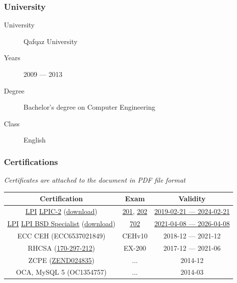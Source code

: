 \documentclass {article}
\begin{document}
      \subsubsection {University}
        \begin {description}
          \item [University] Qafqaz University
          \item [Years] 2009 --- 2013
          \item [Degree] Bachelor's degree on Computer Engineering
          \item [Class] English
        \end {description}

        \subsubsection {Certifications}
        \centering
        \textit {Certificates are attached to the document in PDF file format} \\
          \begin {tabular} { c | c | c }
            \hline			
            \textbf {Certification} & \textbf {Exam} & \textbf {Validity} \\
            \hline  

            \href{https://en.wikipedia.org/wiki/Linux_Professional_Institute}{LPI} \href{https://www.lpi.org/our-certifications/lpic-2-overview}{LPIC-2} (\href{https://cs.lpi.org/caf/Xamman/candidate_area/certificate/LPIC-2/bafrejwgeb}{download}) & \href{https://www.lpi.org/our-certifications/exam-201-objectives}{201}, \href{https://www.lpi.org/our-certifications/exam-202-objectives}{202} & \href{https://cs.lpi.org/caf/Xamman/certification/verify/LPI000307519/bafrejwgeb}{2019-02-21 --- 2024-02-21} \\

            \href{https://en.wikipedia.org/wiki/Linux_Professional_Institute}{LPI} \href{https://www.lpi.org/our-certifications/bsd-overview}{LPI BSD Specialist} (\href{https://cs.lpi.org/caf/Xamman/candidate_area/certificate/BSDS/mvuk2szhhw}{download}) & \href{https://www.lpi.org/our-certifications/exam-702-objectives}{702} & \href{https://cs.lpi.org/caf/Xamman/certification/verify/LPI000307519/mvuk2szhhw}{2021-04-08 --- 2026-04-08} \\

            ECC CEH (ECC6537021849) & CEHv10 &  2018-12 --- 2021-12 \\

            RHCSA (\href{https://rhtapps.redhat.com/verify?certId=170-297-212}{170-297-212}) & EX-200 & 2017-12 --- 2021-06 \\

            ZCPE (\href{https://www.zend-zce.com/en/yellow-pages/ZEND024835}{ZEND024835}) & ... & 2014-12 \\

            OCA, MySQL 5 (OC1354757) &  ... & 2014-03 \\

            \hline  
          \end{tabular}
\end{document}
